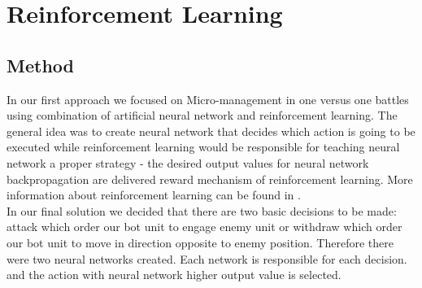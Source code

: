 \section{Reinforcement Learning}
\label{section:RL}

\subsection{Method} \hphantom{x}
In our first approach we focused on Micro-management in one versus one battles using combination of artificial neural network and reinforcement learning. The general idea was to create neural network that decides which action is going to be executed while reinforcement learning would be responsible for teaching neural network a proper strategy - the desired output values for neural network backpropagation are delivered reward mechanism of reinforcement learning. More information about reinforcement learning can be found in \cite{aSurvey}. \\ \hphantom{x}
In our final solution we decided that there are two basic decisions to be made: attack which order our bot unit to engage enemy unit or withdraw which order our bot unit to move in direction opposite to enemy position. Therefore there were two neural networks created. Each network is responsible for each decision. and the action with neural network higher output value is selected.
\\
